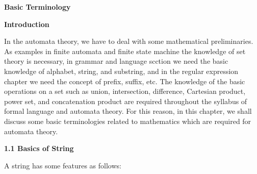\documentclass [10pt,a4paper]{book}
\begin{document}
\begin{flushleft}

\textbf{Basic Terminology}
\end{flushleft}
\begin{flushleft}

\textbf{Introduction}
\end{flushleft}
In the automata theory, we have to deal with some mathematical preliminaries. As examples in finite automata and finite state machine the knowledge of set theory is necessary, in grammar and language scction we need the basic knowledge of alphabet, string, and substring, and in the regular expression chapter we need the concept of prefix, suffix, etc. The knowledge of the basic operations on a set such as union, intersection, difference, Cartesian product, power set, and concatenation product are required throughout the syllabus of formal language and automata theory.
For this reason, in this chapter, we shall discuss some basic terminologies related to mathematics which are required for automata theory.

\begin{flushleft}

\textbf{1.1 Basics of String}
\end{flushleft}


A string has some features as follows:
\end{document}
